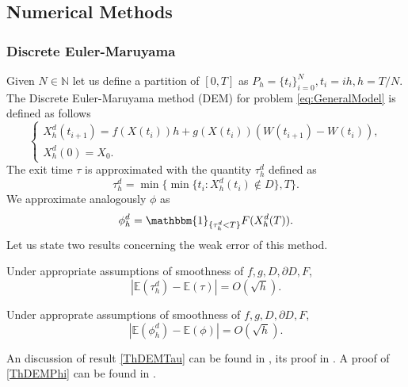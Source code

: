 \subsection{Numerical Methods}

\subsubsection{Discrete Euler-Maruyama}
Given $N \in \mathbb{N}$ let us define a partition of $[0,T]$ as $P_h = \{t_i\}_{i=0}^{N}, t_i = ih, h = T/N$. The Discrete Euler-Maruyama method (DEM) for problem \eqref{eq:GeneralModel} is defined as follows
\begin{equation}\label{eq:DEM}
	\begin{cases}
		X_h^d(t_{i+1}) = f(X(t_i))h + g(X(t_i))(W(t_{i+1}) - W(t_{i})),  \\
		X_h^d(0) = X_0.
	\end{cases}
\end{equation} 
The exit time $\tau$ is approximated with the quantity $\tau_h^d$ defined as 
\begin{equation}\label{eq:TauDEM}
	\tau_h^d = \min\{\min \{t_i \colon X_h^d(t_i) \notin D\},T\}.
\end{equation}
We approximate analogously $\phi$ as
\begin{equation}\label{eq:PhiDEM}
	 \phi_h^d = \mathbbm{1}_{\{\tau_h^d < T\}}F(X_h^d(T)).
\end{equation}
Let us state two results concerning the weak error of this method.
\begin{theorem}\label{ThDEMTau} Under appropriate assumptions of smoothness of $f,g,D,\partial D,F$,
\begin{equation}\label{eq:ConvDEMTau}
	|\mathbb{E}(\tau_h^d) - \mathbb{E}(\tau)| = O(\sqrt{h}).
\end{equation}
\end{theorem}
\begin{theorem}\label{ThDEMPhi} Under approprate assumptions of smoothness of $f,g,D,\partial D,F$,
\begin{equation}\label{eq:ConvDEMPhi}
	|\mathbb{E}(\phi_h^d) - \mathbb{E}(\phi)| = O(\sqrt{h}).
\end{equation}	
\end{theorem}
An discussion of result \ref{ThDEMTau} can be found in \cite{Higham2013}, its proof in \cite{Gobet2010}. A proof of \ref{ThDEMPhi} can be found in \cite{Gobet2000}.


